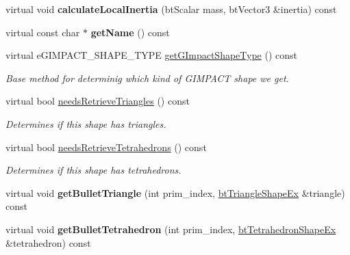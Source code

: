 \begin{DoxyCompactItemize}
virtual void {\bfseries calculate\+Local\+Inertia} (bt\+Scalar mass, bt\+Vector3 \&inertia) const
\item 
\mbox{\label{classbtGImpactMeshShapePart_a4da86f769fd3701c5d40092b0dccc926}} 
virtual const char $\ast$ {\bfseries get\+Name} () const
\item 
virtual e\+G\+I\+M\+P\+A\+C\+T\+\_\+\+S\+H\+A\+P\+E\+\_\+\+T\+Y\+PE \hyperlink{classbtGImpactMeshShapePart_a89fb18e93d2f4078576b6789e59891a2}{get\+G\+Impact\+Shape\+Type} () const
\begin{DoxyCompactList}\small\item\em Base method for determinig which kind of G\+I\+M\+P\+A\+CT shape we get. \end{DoxyCompactList}\item 
\mbox{\label{classbtGImpactMeshShapePart_a82ebf9e731222b2fee8d5c44cd8a0d28}} 
virtual bool \hyperlink{classbtGImpactMeshShapePart_a82ebf9e731222b2fee8d5c44cd8a0d28}{needs\+Retrieve\+Triangles} () const
\begin{DoxyCompactList}\small\item\em Determines if this shape has triangles. \end{DoxyCompactList}\item 
\mbox{\label{classbtGImpactMeshShapePart_ab800ef8c218a4776b264a918728a2ea0}} 
virtual bool \hyperlink{classbtGImpactMeshShapePart_ab800ef8c218a4776b264a918728a2ea0}{needs\+Retrieve\+Tetrahedrons} () const
\begin{DoxyCompactList}\small\item\em Determines if this shape has tetrahedrons. \end{DoxyCompactList}\item 
\mbox{\label{classbtGImpactMeshShapePart_a4a46ebb0cd93bdc7b7d300ab839f84a1}} 
virtual void {\bfseries get\+Bullet\+Triangle} (int prim\+\_\+index, \hyperlink{classbtTriangleShapeEx}{bt\+Triangle\+Shape\+Ex} \&triangle) const
\item 
\mbox{\label{classbtGImpactMeshShapePart_adf717b6d42fc9071da5404fdd45ec2c4}} 
virtual void {\bfseries get\+Bullet\+Tetrahedron} (int prim\+\_\+index, \hyperlink{classbtTetrahedronShapeEx}{bt\+Tetrahedron\+Shape\+Ex} \&tetrahedron) const

\end{DoxyCompactItemize}
